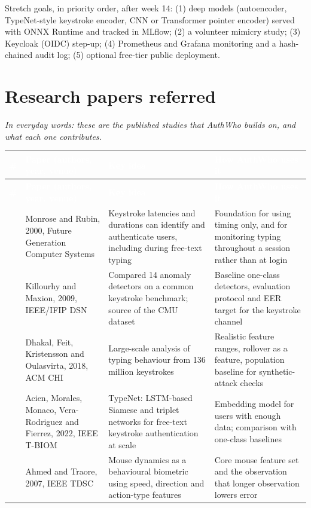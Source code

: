 \documentclass[10pt,letterpaper]{article}
\newcommand{\hd}[1]{\textcolor{white}{\bfseries #1}}
\newcommand{\headrow}{\rowcolor{navy}}
\begin{document}
Stretch goals, in priority order, after week 14: (1) deep models (autoencoder, TypeNet-style keystroke encoder, CNN or Transformer pointer encoder) served with ONNX Runtime and tracked in MLflow; (2) a volunteer mimicry study; (3) Keycloak (OIDC) step-up; (4) Prometheus and Grafana monitoring and a hash-chained audit log; (5) optional free-tier public deployment.

\section{Research papers referred}

\emph{In everyday words: these are the published studies that AuthWho builds on, and what each one contributes.}

\begin{xltabular}{\textwidth}{P{0.6cm} P{4.2cm} L L}
\headrow \hd{\#} & \hd{Paper (authors, year, venue)} & \hd{Key idea} & \hd{How AuthWho uses it} \\
\endfirsthead
\headrow \hd{\#} & \hd{Paper (authors, year, venue)} & \hd{Key idea} & \hd{How AuthWho uses it} \\
\endhead
\cite{monrose2000} & Monrose and Rubin, 2000, Future Generation Computer Systems & Keystroke latencies and durations can identify and authenticate users, including during free-text typing & Foundation for using timing only, and for monitoring typing throughout a session rather than at login \\ \hline
\cite{killourhy2009} & Killourhy and Maxion, 2009, IEEE/IFIP DSN & Compared 14 anomaly detectors on a common keystroke benchmark; source of the CMU dataset & Baseline one-class detectors, evaluation protocol and EER target for the keystroke channel \\ \hline
\cite{dhakal2018} & Dhakal, Feit, Kristensson and Oulasvirta, 2018, ACM CHI & Large-scale analysis of typing behaviour from 136 million keystrokes & Realistic feature ranges, rollover as a feature, population baseline for synthetic-attack checks \\ \hline
\cite{acien2022} & Acien, Morales, Monaco, Vera-Rodriguez and Fierrez, 2022, IEEE T-BIOM & TypeNet: LSTM-based Siamese and triplet networks for free-text keystroke authentication at scale & Embedding model for users with enough data; comparison with one-class baselines \\ \hline
\cite{ahmed2007} & Ahmed and Traore, 2007, IEEE TDSC & Mouse dynamics as a behavioural biometric using speed, direction and action-type features & Core mouse feature set and the observation that longer observation lowers error \\ \hline

\end{xltabular}
\end{document}
